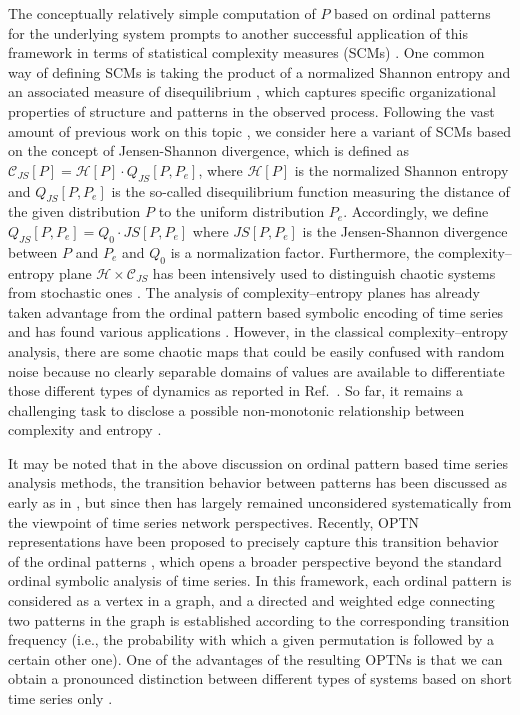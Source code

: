 \documentclass[aip,cha,reprint,nofootinbib]{revtex4-1}
\begin{document}
The conceptually relatively simple computation of $P$ based on ordinal patterns for the underlying system prompts to another successful application of this framework in terms of statistical complexity measures (SCMs) \cite{kowalskiEntropy2011}. One common way of defining SCMs is taking the product of a normalized Shannon entropy and an associated measure of disequilibrium \cite{LopezPLA1995,kowalskiEntropy2011}, which captures specific organizational properties of structure and patterns in the observed process. Following the vast amount of previous work on this topic  \cite{rossoPRL2007,LopezPLA1995,kowalskiEntropy2011,Lange2013}, we consider here a variant of SCMs based on the concept of Jensen-Shannon divergence, which is defined as $\mathcal{C}_{JS}[P] = \mathcal{H}[P] \cdot  Q_{JS}[P, P_e]$, where $\mathcal{H}[P]$ is the normalized Shannon entropy and $Q_{JS}[P, P_e]$ is the so-called disequilibrium function measuring the distance of the given distribution $P$ to the uniform distribution $P_e$. Accordingly, we define $Q_{JS}[P, P_e] = Q_{0} \cdot JS[P, P_e]$ where $JS[P, P_e]$ is the Jensen-Shannon divergence between $P$ and $P_e$ and $Q_{0}$ is a normalization factor. Furthermore, the complexity--entropy plane $\mathcal{H} \times \mathcal{C}_{JS}$ has been intensively used to distinguish chaotic systems from stochastic ones \cite{rossoPRL2007}. The analysis of complexity--entropy planes has already taken advantage from the ordinal pattern based symbolic encoding of time series and has found various applications \cite{rossoPRL2007,kowalskiEntropy2011}. However, in the classical complexity--entropy analysis, there are some chaotic maps that could be easily confused with random noise because no clearly separable domains of values are available to differentiate those different types of dynamics as reported in Ref.~\cite{BorgesAMC2019}. So far, it remains a challenging task to disclose a possible non-monotonic relationship between complexity and entropy \cite{MartinPLA2003}. 

It may be noted that in the above discussion on ordinal pattern based time series analysis methods, the transition behavior between patterns {\color{red} has been discussed as early as in \cite{batesPLA1993}, but since then has largely remained unconsidered systematically from the viewpoint of time series network perspectives.} Recently, OPTN representations have been proposed to precisely capture this transition behavior of the ordinal patterns \cite{MichaelChaos2015,KulpChaos2016,zhangSciRep2017,McCullough2017b,BorgesAMC2019}, which opens a broader perspective beyond the standard ordinal symbolic analysis of time series. In this framework, each ordinal pattern is considered as a vertex in a graph, and a directed and weighted edge connecting two patterns in the graph is established according to the corresponding transition frequency (i.e., the probability with which a given permutation is followed by a certain other one). One of the advantages of the resulting OPTNs is that we can obtain a pronounced distinction between different types of systems based on short time series only \cite{MichaelChaos2015,BorgesAMC2019}. 
\end{document}
